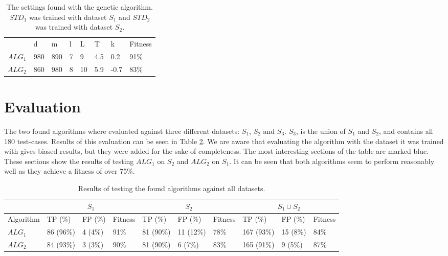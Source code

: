 \begin{table}[]
	\centering
\begin{tabular}{l|llllll|l}
	              & d   & m   & l & L  & T   & k    & Fitness \\ \cline{1-8} 
	$ALG_1$       & 980 & 890 & 7 & 9  & 4.5 & 0.2  & 91\%    \\
	$ALG_2$       & 860 & 980 & 8 & 10 & 5.9 & -0.7 & 83\%
\end{tabular}
	\caption{The settings found with the genetic algorithm. $STD_1$ was trained with dataset $S_1$ and $STD_2$ was trained with dataset $S_2$.\label{Found_settings}}
\end{table}

\section{Evaluation}
The two found algorithms where evaluated against three different datasets: $S_1$, $S_2$ and $S_3$. $S_3$, is the union of $S_1$ and $S_2$, and contains all 180 test-cases. Results of this evaluation can be seen in Table \ref{tbl:Scoringresults}. We are aware that evaluating the algorithm with the dataset it was trained with gives biased results, but they were added for the sake of completeness. The most interesting sections of the table are marked blue. These sections show the results of testing $ALG_1$ on $S_2$ and $ALG_2$ on $S_1$. It can be seen that both algorithms seem to perform reasonably well as they achieve a fitness of over 75\%.

\begin{table}[]
	\hskip-2.7cm
\begin{tabular}{l|lll|lll|lll}
	& \multicolumn{3}{c|}{$S_1$}                                                                         & \multicolumn{3}{c|}{$S_2$}                                                                           & \multicolumn{3}{c}{$S_1 \cup S_2$} \\ \hline
	Algorithm & TP (\%)                           & FP (\%)                         & Fitness                      & TP (\%)                           & FP (\%)                           & Fitness                      & TP (\%)      & FP (\%)   & Fitness  \\ \hline
	$ALG_1$   & 86 (96\%)                         & 4 (4\%)                         & 91\%                         & \cellcolor[HTML]{BBDAFF}81 (90\%) & \cellcolor[HTML]{BBDAFF}11 (12\%) & \cellcolor[HTML]{BBDAFF}78\% & 167 (93\%)   & 15 (8\%)  & 84\%     \\
	$ALG_2$   & \cellcolor[HTML]{BBDAFF}84 (93\%) & \cellcolor[HTML]{BBDAFF}3 (3\%) & \cellcolor[HTML]{BBDAFF}90\% & 81 (90\%)                         & 6 (7\%)                           & 83\%                         & 165 (91\%)   & 9 (5\%)   & 87\%    
\end{tabular}
	\caption{Results of testing the found algorithms against all datasets.\label{tbl:Scoringresults}}
\end{table}

